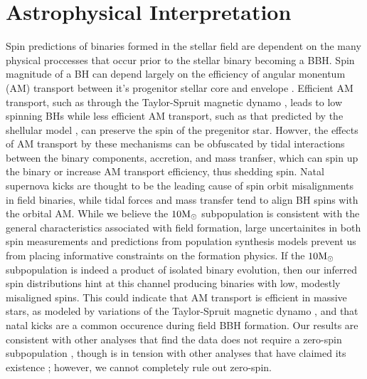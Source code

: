 \section{Astrophysical Interpretation} \label{sec:astro}


Spin predictions of binaries formed in the stellar field are dependent on the many physical proccesses that occur prior to the stellar binary becoming a BBH.  Spin magnitude of a BH can depend largely on the efficiency of angular monentum (AM) transport between it's progenitor stellar core and envelope \citep{2203.02515}. Efficient AM transport, such as through the Taylor-Spruit magnetic dynamo \citep{10.1051/0004-6361:20011465}, leads to low spinning BHs while less efficient AM transport, such as that predicted by the shellular model \citep{1992A&A...265..115Z,2012A&A...537A.146E,10.3847/1538-4365/aacb24,2019MNRAS.485.4641C}, can preserve the spin of the pregenitor star. Howver, the effects of AM transport by these mechanisms can be obfuscated by tidal interactions between the binary components, accretion, and mass tranfser, which can spin up the binary or increase AM transport efficiency, thus shedding spin. Natal supernova kicks are thought to be the leading cause of spin orbit misalignments in field binaries, while tidal forces and mass transfer tend to align BH spins with the orbital AM. While we believe the $10{\rm M}_\odot$ subpopulation is consistent with the general characteristics associated with field formation, large uncertainites in both spin measurements and predictions from population synthesis models prevent us from placing informative constraints on the formation physics. If the $10{\rm M}_\odot$ subpopulation is indeed a product of isolated binary evolution, then our inferred spin distributions hint at this channel producing binaries with low, modestly misaligned spins. This could indicate that AM transport is efficient in massive stars, as modeled by variations of the Taylor-Spruit magnetic dynamo \citep{1706.07053}, and that natal kicks are a common occurence during field BBH formation. Our results are consistent with other analyses that find the data does not require a zero-spin subpopulation \citep{arXiv2205.08574,2301.01312}, though is in tension with other analyses that have claimed its existence \citep{doi.org/10.3847/2041-8213/ac2f3c,2105.10580}; however, we cannot completely rule out zero-spin.

